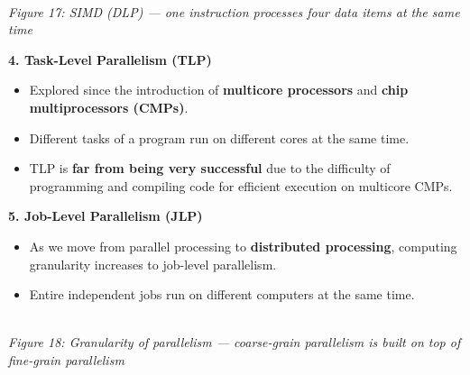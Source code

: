 \documentclass[11pt,a4paper]{article}
\newcommand{\figcap}[1]{\\[2pt]{\footnotesize\textit{#1}}}
\begin{document}
\begin{center}
\figcap{Figure 17: SIMD (DLP) --- one instruction processes four data items at the same time}
\end{center}

\textbf{4. Task-Level Parallelism (TLP)}
\begin{itemize}
\item Explored since the introduction of \textbf{multicore processors} and \textbf{chip multiprocessors (CMPs)}.
\item Different tasks of a program run on different cores at the same time.
\item TLP is \textbf{far from being very successful} due to the difficulty of programming and compiling code for efficient execution on multicore CMPs.
\end{itemize}

\textbf{5. Job-Level Parallelism (JLP)}
\begin{itemize}
\item As we move from parallel processing to \textbf{distributed processing}, computing granularity increases to job-level parallelism.
\item Entire independent jobs run on different computers at the same time.
\end{itemize}

\begin{center}
\figcap{Figure 18: Granularity of parallelism --- coarse-grain parallelism is built on top of fine-grain parallelism}
\end{center}
\end{document}
